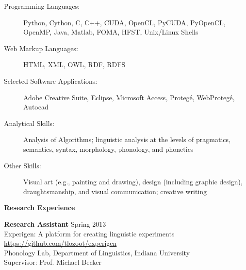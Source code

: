 \begin{singlespace}
\begin{description}
\item[Programming Languages:]
Python, Cython, C, C++, CUDA, OpenCL, PyCUDA, PyOpenCL, OpenMP, Java, Matlab, FOMA, HFST, Unix/Linux Shells 
\item[Web Markup Languages:] HTML, XML, OWL, RDF, RDFS
\item[Selected Software Applications:] Adobe Creative Suite, Eclipse, Microsoft Access, Proteg\'e, WebProteg\'e, Autocad
\item[Analytical Skills:] Analysis of Algorithms; linguistic analysis at the levels of pragmatics, semantics, syntax, morphology, phonology, and phonetics
\item[Other Skills:] %
Visual art (e.g., painting and drawing), design (including graphic design), draughtsmanship, and visual communication; creative writing
\end{description}
\vspace{21pt}
\centerline{\textbf{Research Experience}}
\vspace{12pt}
\noindent\textbf{Research Assistant} \hfill Spring 2013 \\
\hspace{2ex} Experigen: A platform for creating linguistic experiments \\
\hspace{2ex} \url{https://github.com/tlozoot/experigen} \\
\hspace{2ex} Phonology Lab, Department of Linguistics, Indiana University \\
\hspace{2ex} Supervisor: Prof. Michael Becker
\begin{itemize} %

\end{itemize}
\end{singlespace}
